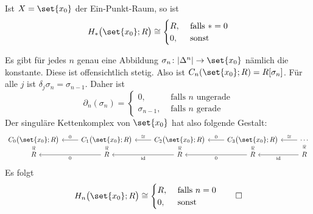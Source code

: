 \begin{beispiel}[{name=[Die Homologie des Ein-Punkt-Raumes]},label=bsp:58]
	Ist $X= \set{x_0}$ der Ein-Punkt-Raum, so ist 
	\[
		H_* \enbrace[\big]{\set{x_0};R} \cong \begin{cases}
		R, &\text{ falls }*=0\\
		0 , &\text{ sonst } 
	\end{cases} 
	\]
\end{beispiel}
\begin{beweis}
	Es gibt für jedes $n$ genau eine Abbildung $\sigma_n \colon \abs*{\Delta^n} \to \set{x_0}$ nämlich die konstante. 
	Diese ist offensichtlich stetig. 
	Also ist $C_n \enbrace*{\set{x_0};R}=R[\sigma_n]$. 
	Für alle $j$ ist $\delta_j \sigma_n = \sigma_{n-1}$. Daher ist
	\[
		\partial_n(\sigma_n) = \begin{cases}
			0, &\text{ falls }n \text{ ungerade}\\
			\sigma_{n-1} , &\text{ falls } n \text{ gerade}
		\end{cases}
	\]
	Der singuläre Kettenkomplex von $\set{x_0}$ hat also folgende Gestalt:
	\[
		\begin{tikzcd}[row sep=0.4em]
			C_0 \enbrace[\big]{\set{x_0};R} \arrow[draw=none]{d}[sloped,auto=false]{\cong} 
			& C_1 \enbrace[\big]{\set{x_0};R} \lar["0", swap] \arrow[draw=none]{d}[sloped,auto=false]{\cong} & 
			C_2 \enbrace[\big]{\set{x_0};R} \lar["\cong", swap] \arrow[draw=none]{d}[sloped,auto=false]{\cong} 
			& C_3 \enbrace[\big]{\set{x_0};R} \lar["0", swap] \arrow[draw=none]{d}[sloped,auto=false]{\cong}
			& \cdots \lar["\cong",swap] \arrow[draw=none]{d}[sloped,auto=false]{\cong} \\
			R & R \lar["0"] & R \lar["\id"] & R \lar["0"] & R \lar["\id"]
		\end{tikzcd}
	\]
	Es folgt
	\[
		H_n \enbrace[\big]{\set{x_0};R } \cong \begin{cases}
			R, &\text{ falls }n=0\\
			0 , &\text{ sonst}
		\end{cases} \qedhere
	\]
\end{beweis}

